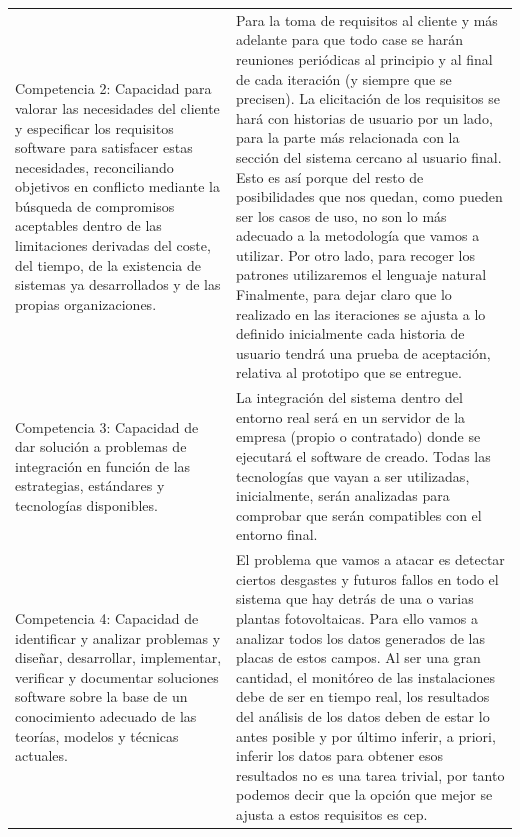 \documentclass[a4paper]{article}
\begin{document}
\begin{center}
\begin{supertabular}{m{5.605cm}m{10.849cm}}
    {\color{black} Competencia 2: Capacidad para valorar las necesidades del cliente y especificar los requisitos software para satisfacer estas necesidades, reconciliando objetivos en conflicto mediante la b\'usqueda de compromisos aceptables dentro de las limitaciones derivadas del coste, del tiempo, de la existencia de sistemas ya desarrollados y de las propias organizaciones.} &
    {\color{black} Para la toma de requisitos al cliente y más adelante para que todo case se harán reuniones periódicas al principio y al final de cada iteración (y siempre que se precisen).
    La elicitación de los requisitos se hará con historias de usuario por un lado, para la parte más relacionada con la sección del sistema cercano al usuario final. Esto es así porque del resto de posibilidades que nos quedan, como pueden ser los casos de uso, no son lo más adecuado a la metodología que vamos a utilizar. Por otro lado, para recoger los patrones utilizaremos el lenguaje natural\newline
    Finalmente, para dejar claro que lo realizado en las iteraciones se ajusta a lo definido inicialmente cada historia de usuario tendrá una prueba de aceptación, relativa al prototipo que se entregue.}\\
    
    {\color{black} Competencia 3: Capacidad de dar soluci\'on a problemas de integraci\'on en funci\'on de las estrategias, est\'andares y tecnolog\'ias disponibles. } &
    {\color{black} 
    La integración del sistema dentro del entorno real será en un servidor de la empresa (propio o contratado) donde se ejecutará el software de creado. Todas las tecnologías que vayan a ser utilizadas, inicialmente, serán analizadas para comprobar que serán compatibles con el entorno final.}\\
    
    {\color{black} Competencia 4: Capacidad de identificar y analizar problemas y dise\~nar, desarrollar, implementar, verificar y documentar soluciones software sobre la base de un conocimiento adecuado de las teor\'ias, modelos y t\'ecnicas actuales.} &
    {\color{black}El problema que vamos a atacar es detectar ciertos desgastes y futuros fallos en todo el sistema que hay detrás de una o varias plantas fotovoltaicas. Para ello vamos a analizar todos los datos generados de las placas de estos campos. Al ser una gran cantidad, el monitóreo de las instalaciones debe de ser en tiempo real, los resultados del análisis de los datos deben de estar lo antes posible y por último inferir, a priori, inferir los datos para obtener esos resultados no es una tarea trivial, por tanto podemos decir que la opción que mejor se ajusta a estos requisitos es cep.
    
}
\end{supertabular}
\end{center}
\end{document}
